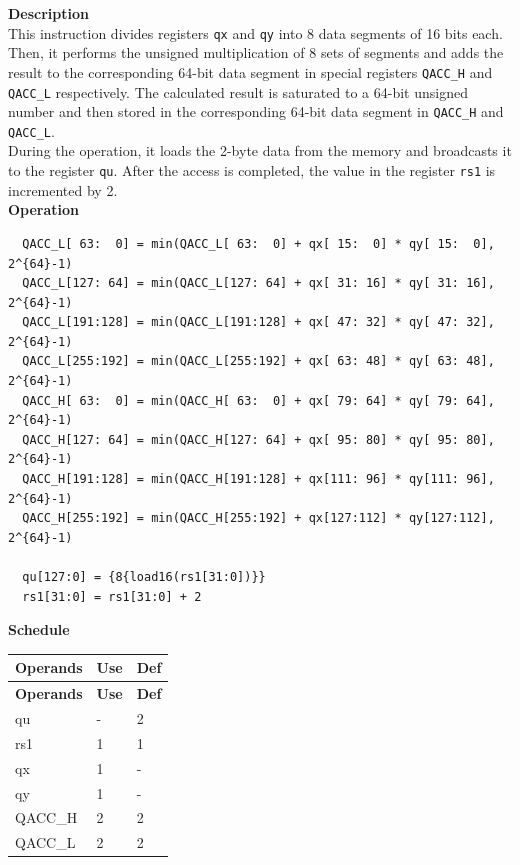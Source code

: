\textbf{Description}\\
This instruction divides registers \lstinline{qx} and \lstinline{qy} into 8 data segments of 16 bits each. Then, it performs the unsigned multiplication of 8 sets of segments and adds the result to the corresponding 64-bit data segment in special registers \lstinline{QACC_H} and \lstinline{QACC_L} respectively. The calculated result is saturated to a 64-bit unsigned number and then stored in the corresponding 64-bit data segment in \lstinline{QACC_H} and \lstinline{QACC_L}.\\
During the operation, it loads the 2-byte data from the memory and broadcasts it to the register \lstinline{qu}. After the access is completed, the value in the register \lstinline{rs1} is incremented by 2.\\
\textbf{Operation}
\begin{lstlisting}
  QACC_L[ 63:  0] = min(QACC_L[ 63:  0] + qx[ 15:  0] * qy[ 15:  0], 2^{64}-1)
  QACC_L[127: 64] = min(QACC_L[127: 64] + qx[ 31: 16] * qy[ 31: 16], 2^{64}-1)
  QACC_L[191:128] = min(QACC_L[191:128] + qx[ 47: 32] * qy[ 47: 32], 2^{64}-1)
  QACC_L[255:192] = min(QACC_L[255:192] + qx[ 63: 48] * qy[ 63: 48], 2^{64}-1)
  QACC_H[ 63:  0] = min(QACC_H[ 63:  0] + qx[ 79: 64] * qy[ 79: 64], 2^{64}-1)
  QACC_H[127: 64] = min(QACC_H[127: 64] + qx[ 95: 80] * qy[ 95: 80], 2^{64}-1)
  QACC_H[191:128] = min(QACC_H[191:128] + qx[111: 96] * qy[111: 96], 2^{64}-1)
  QACC_H[255:192] = min(QACC_H[255:192] + qx[127:112] * qy[127:112], 2^{64}-1)

  qu[127:0] = {8{load16(rs1[31:0])}}
  rs1[31:0] = rs1[31:0] + 2
\end{lstlisting}

\textbf{Schedule}\\
\begin{longtable}[c]{|l|l|l|}
    \hline
    \rowcolor{lightgray}
    \textbf{Operands} & \textbf{Use} & \textbf{Def} \\\hline
    \endfirsthead
    \hline
    \rowcolor{lightgray}
     \textbf{Operands} & \textbf{Use} & \textbf{Def} \\\hline
    \endhead
    \hline
    \endfoot

    qu & - & 2 \\\hline
    rs1 & 1 & 1 \\\hline
     qx & 1 & - \\\hline
     qy & 1 & - \\\hline
     QACC\_H & 2 & 2 \\\hline
     QACC\_L & 2 & 2

\end{longtable}

